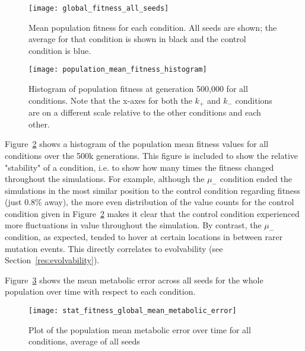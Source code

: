\begin{figure}[H]
	\texttt{[image: global\_fitness\_all\_seeds]}
	\caption[Fitness all seeds all conditions]{Mean population fitness for each condition. All seeds are shown; the average for that condition is shown in black and the control condition is blue.}
	\label{fig:mean_fitness_all_seeds}
\end{figure}

\begin{figure}[H]
	\texttt{[image: population\_mean\_fitness\_histogram]}
	\caption[Mean fitness histogram]{Histogram of population fitness at generation 500,000 for all conditions. Note that the x-axes for both the $k_+$ and $k_-$ conditions are on a different scale relative to the other conditions and each other.}
	\label{fig:global_fitness_histogram}
\end{figure}
Figure~\ref{fig:global_fitness_histogram} shows a histogram of the population mean fitness values for all conditions over the 500k generations. This figure is included to show the relative "stability" of a condition, i.e. to show how many times the fitness changed throughout the simulations. For example, although the $\mu_-$ condition ended the simulations in the most similar position to the control condition regarding fitness (just 0.8\% away), the more even distribution of the value counts for the control condition given in Figure~\ref{fig:global_fitness_histogram} makes it clear that the control condition experienced more fluctuations in value throughout the simulation. By contrast, the $\mu_-$ condition, as expected, tended to hover at certain locations in between rarer mutation events. This directly correlates to evolvability (see Section~\ref{res:evolvability}). 

Figure~\ref{fig:mean_metabolic_error} shows the mean metabolic error across all seeds for the whole population over time with respect to each condition. 
\begin{figure}[H]
	\texttt{[image: stat\_fitness\_global\_mean\_metabolic\_error]}
	\caption[Metabolic error]{Plot of the population mean metabolic error over time for all conditions, average of all seeds}
	\label{fig:mean_metabolic_error}
\end{figure}

